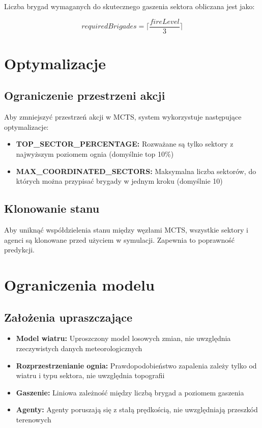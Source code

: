 Liczba brygad wymaganych do skutecznego gaszenia sektora obliczana jest jako:

\begin{equation}
requiredBrigades = \lceil \frac{fireLevel}{3} \rceil
\end{equation}

\section{Optymalizacje}

\subsection{Ograniczenie przestrzeni akcji}

Aby zmniejszyć przestrzeń akcji w MCTS, system wykorzystuje następujące optymalizacje:

\begin{itemize}
    \item \textbf{TOP\_SECTOR\_PERCENTAGE:} Rozważane są tylko sektory z najwyższym poziomem ognia (domyślnie top 10\%)
    \item \textbf{MAX\_COORDINATED\_SECTORS:} Maksymalna liczba sektorów, do których można przypisać brygady w jednym kroku (domyślnie 10)
\end{itemize}

\subsection{Klonowanie stanu}

Aby uniknąć współdzielenia stanu między węzłami MCTS, wszystkie sektory i agenci są klonowane przed użyciem w symulacji. Zapewnia to poprawność predykcji.

\section{Ograniczenia modelu}

\subsection{Założenia upraszczające}

\begin{itemize}
    \item \textbf{Model wiatru:} Uproszczony model losowych zmian, nie uwzględnia rzeczywistych danych meteorologicznych
    \item \textbf{Rozprzestrzenianie ognia:} Prawdopodobieństwo zapalenia zależy tylko od wiatru i typu sektora, nie uwzględnia topografii
    \item \textbf{Gaszenie:} Liniowa zależność między liczbą brygad a poziomem gaszenia
    \item \textbf{Agenty:} Agenty poruszają się z stałą prędkością, nie uwzględniają przeszkód terenowych
\end{itemize}

